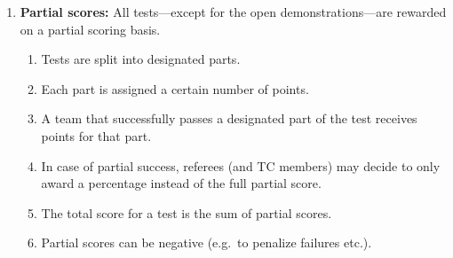 \begin{enumerate}
	\item \textbf{Partial scores:} All tests---except for the open demonstrations---are rewarded on a partial scoring basis.
	\begin{enumerate}
		\item Tests are split into designated parts.
		\item Each part is assigned a certain number of points.
		\item A team that successfully passes a designated part of the test receives points for that part.
		\item In case of partial success, referees (and TC members) may decide to only award a percentage instead of the full partial score.
		\item The total score for a test is the sum of partial scores.
		\item Partial scores can be negative (e.g.~to penalize failures etc.).
	\end{enumerate}
\end{enumerate}


